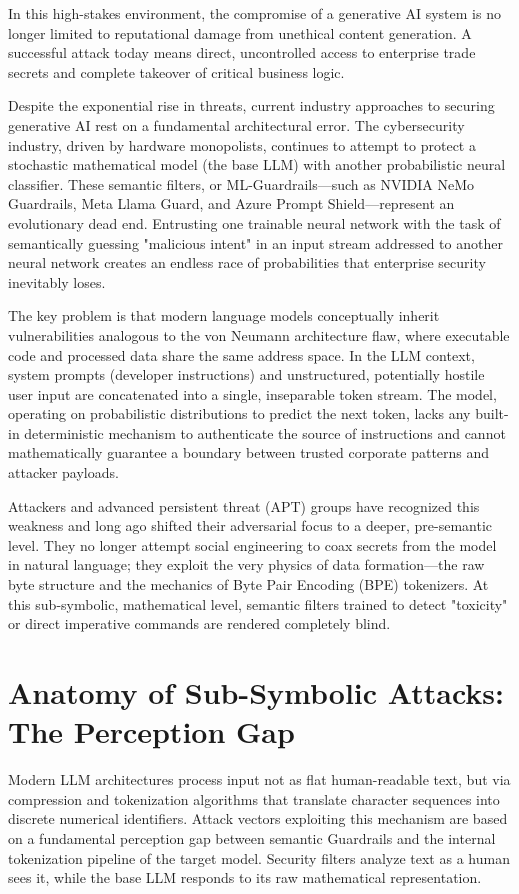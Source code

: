 \documentclass[10pt,a4paper]{article}
\begin{document}
In this high-stakes environment, the compromise of a generative AI system is no longer limited to reputational damage from unethical content generation. A successful attack today means direct, uncontrolled access to enterprise trade secrets and complete takeover of critical business logic.

Despite the exponential rise in threats, current industry approaches to securing generative AI rest on a fundamental architectural error. The cybersecurity industry, driven by hardware monopolists, continues to attempt to protect a stochastic mathematical model (the base LLM) with another probabilistic neural classifier. These semantic filters, or ML-Guardrails---such as NVIDIA NeMo Guardrails, Meta Llama Guard, and Azure Prompt Shield---represent an evolutionary dead end. Entrusting one trainable neural network with the task of semantically guessing "malicious intent" in an input stream addressed to another neural network creates an endless race of probabilities that enterprise security inevitably loses.

The key problem is that modern language models conceptually inherit vulnerabilities analogous to the von Neumann architecture flaw, where executable code and processed data share the same address space. In the LLM context, system prompts (developer instructions) and unstructured, potentially hostile user input are concatenated into a single, inseparable token stream. The model, operating on probabilistic distributions to predict the next token, lacks any built-in deterministic mechanism to authenticate the source of instructions and cannot mathematically guarantee a boundary between trusted corporate patterns and attacker payloads.

Attackers and advanced persistent threat (APT) groups have recognized this weakness and long ago shifted their adversarial focus to a deeper, pre-semantic level. They no longer attempt social engineering to coax secrets from the model in natural language; they exploit the very physics of data formation---the raw byte structure and the mechanics of Byte Pair Encoding (BPE) tokenizers. At this sub-symbolic, mathematical level, semantic filters trained to detect "toxicity" or direct imperative commands are rendered completely blind.

\section{Anatomy of Sub-Symbolic Attacks: The Perception Gap}
Modern LLM architectures process input not as flat human-readable text, but via compression and tokenization algorithms that translate character sequences into discrete numerical identifiers. Attack vectors exploiting this mechanism are based on a fundamental perception gap between semantic Guardrails and the internal tokenization pipeline of the target model. Security filters analyze text as a human sees it, while the base LLM responds to its raw mathematical representation.
\end{document}
